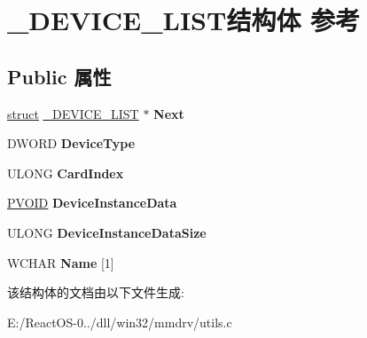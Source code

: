 \hypertarget{struct___d_e_v_i_c_e___l_i_s_t}{}\section{\+\_\+\+D\+E\+V\+I\+C\+E\+\_\+\+L\+I\+S\+T结构体 参考}
\label{struct___d_e_v_i_c_e___l_i_s_t}
\subsection*{Public 属性}
\begin{DoxyCompactItemize}
\item 
\mbox{\label{struct___d_e_v_i_c_e___l_i_s_t_a817e790f9b8f14053172305bd61e1402}} 
\hyperlink{interfacestruct}{struct} \hyperlink{struct___d_e_v_i_c_e___l_i_s_t}{\+\_\+\+D\+E\+V\+I\+C\+E\+\_\+\+L\+I\+ST} $\ast$ {\bfseries Next}
\item 
\mbox{\label{struct___d_e_v_i_c_e___l_i_s_t_a8828ed8694b0e614265b0bfb9f4f2785}} 
D\+W\+O\+RD {\bfseries Device\+Type}
\item 
\mbox{\label{struct___d_e_v_i_c_e___l_i_s_t_a092357429eaa49af384371dbb505766d}} 
U\+L\+O\+NG {\bfseries Card\+Index}
\item 
\mbox{\label{struct___d_e_v_i_c_e___l_i_s_t_a44d5d09d92aee3474743e430aa8d9ea6}} 
\hyperlink{interfacevoid}{P\+V\+O\+ID} {\bfseries Device\+Instance\+Data}
\item 
\mbox{\label{struct___d_e_v_i_c_e___l_i_s_t_a83e390dc122b1cfeb521b9e0f73f9e58}} 
U\+L\+O\+NG {\bfseries Device\+Instance\+Data\+Size}
\item 
\mbox{\label{struct___d_e_v_i_c_e___l_i_s_t_a8a1c4ba918c70eb3e2785416e0052108}} 
W\+C\+H\+AR {\bfseries Name} \mbox{[}1\mbox{]}
\end{DoxyCompactItemize}


该结构体的文档由以下文件生成\+:\begin{DoxyCompactItemize}
\item 
E\+:/\+React\+O\+S-\/0../dll/win32/mmdrv/utils.\+c\end{DoxyCompactItemize}
